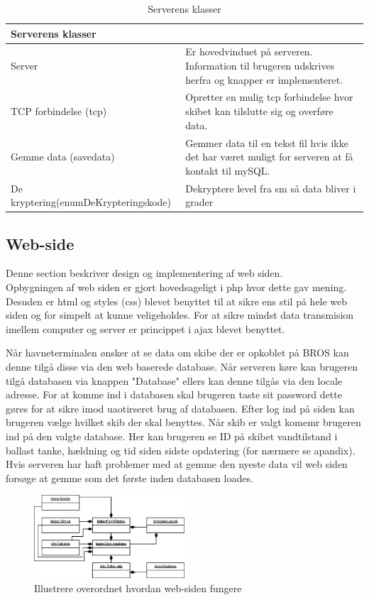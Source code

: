 \begin{table}[H]
\centering
\begin{tabular}{p{3cm} p{12.5cm}}
\multicolumn{2}{l}{{\Large Serverens klasser}} \\\hline
Server & Er hovedvinduet på serveren. Information til brugeren udskrives herfra og knapper er implementeret. \\
TCP forbindelse (tcp) & Opretter en mulig tcp forbindelse hvor skibet kan tilslutte sig og overføre data.\\
Gemme data (savedata) & Gemmer data til en tekst fil hvis ikke det har været muligt for serveren at få kontakt til mySQL.\\
De kryptering(enumDeKrypteringskode) & Dekryptere level fra sm så data bliver i grader\\
\end{tabular}
\caption{Serverens klasser}
\label{tabel:server-klasser}
\end{table}

\subsection{Web-side}
Denne section beskriver design og implementering af web siden.\\
Opbygningen af web siden er gjort hovedsageligt i php hvor dette gav mening. Desuden er html og styles (css) blevet benyttet til at sikre ens stil på hele web siden og for simpelt at kunne veligeholdes. For at sikre mindst data transmision imellem computer og server er princippet i ajax blevet benyttet.

Når havneterminalen ønsker at se data om skibe der er opkoblet på BROS kan denne tilgå disse via den web baserede database. Når serveren køre kan brugeren tilgå databasen via knappen "Database" ellers kan denne tilgås via den locale adresse. For at komme ind i databasen skal brugeren taste sit password dette gøres for at sikre imod uaotirseret brug af databasen. Efter log ind på siden kan brugeren vælge hvilket skib der skal benyttes. Når skib er valgt komemr brugeren ind på den valgte database. Her kan brugeren se ID på skibet vandtilstand i ballast tanke, hældning og tid siden sidste opdatering (for nærmere se apandix). Hvis serveren har haft problemer med at gemme den nyeste data vil web siden forsøge at gemme som det første inden databasen loades. 

\begin{figure}[H]
\centering
\includegraphics[width = 0.5\textwidth]{billeder/database_web}
\caption{Illustrere overordnet hvordan web-siden fungere}
\label{fig:database_web}
\end{figure}

